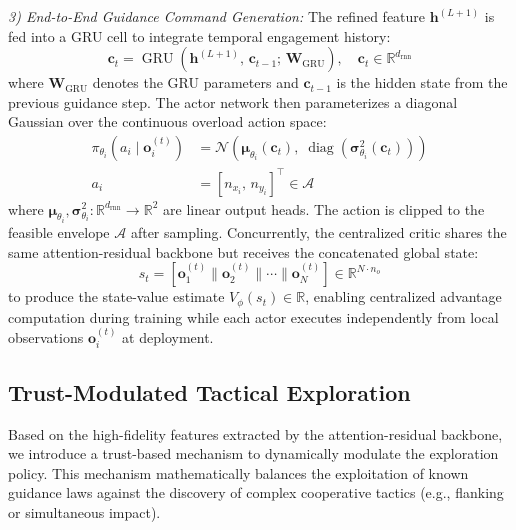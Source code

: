 \documentclass[lettersize,journal]{IEEEtran}
\begin{document}
\emph{3) End-to-End Guidance Command Generation:} The refined feature $\mathbf{h}^{(L+1)}$ is fed into a GRU cell to integrate temporal engagement history:
\begin{equation}
\label{eq:gru}
\mathbf{c}_t = \operatorname{GRU}\!\left(\mathbf{h}^{(L+1)},\, \mathbf{c}_{t-1};\, \mathbf{W}_{\mathrm{GRU}}\right), \quad \mathbf{c}_t \in \mathbb{R}^{d_{\mathrm{rnn}}}
\end{equation}
where $\mathbf{W}_{\mathrm{GRU}}$ denotes the GRU parameters and $\mathbf{c}_{t-1}$ is the hidden state from the previous guidance step. The actor network then parameterizes a diagonal Gaussian over the continuous overload action space:
\begin{equation}
\label{eq:actor_dist}
\begin{split}
\pi_{\theta_i}\!\left(a_i \mid \mathbf{o}_i^{(t)}\right) &= \mathcal{N}\!\left(\boldsymbol{\mu}_{\theta_i}(\mathbf{c}_t),\; \operatorname{diag}\!\left(\boldsymbol{\sigma}_{\theta_i}^2(\mathbf{c}_t)\right)\right) \\
a_i &= [n_{x_i},\, n_{y_i}]^\top \in \mathcal{A}
\end{split}
\end{equation}
where $\boldsymbol{\mu}_{\theta_i}, \boldsymbol{\sigma}_{\theta_i}^2: \mathbb{R}^{d_{\mathrm{rnn}}} \to \mathbb{R}^2$ are linear output heads. The action is clipped to the feasible envelope $\mathcal{A}$ after sampling. Concurrently, the centralized critic shares the same attention-residual backbone but receives the concatenated global state:
\begin{equation}
\label{eq:critic_input}
s_t = \left[\mathbf{o}_1^{(t)} \| \mathbf{o}_2^{(t)} \| \cdots \| \mathbf{o}_N^{(t)}\right] \in \mathbb{R}^{N \cdot n_o}
\end{equation}
to produce the state-value estimate $V_\phi(s_t) \in \mathbb{R}$, enabling centralized advantage computation during training while each actor executes independently from local observations $\mathbf{o}_i^{(t)}$ at deployment.

\subsection{Trust-Modulated Tactical Exploration}
\label{subsec:trust_exploration}

Based on the high-fidelity features extracted by the attention-residual backbone, we introduce a trust-based mechanism to dynamically modulate the exploration policy. This mechanism mathematically balances the exploitation of known guidance laws against the discovery of complex cooperative tactics (e.g., flanking or simultaneous impact).
\end{document}
